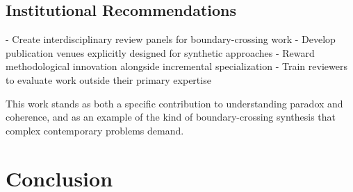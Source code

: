 \documentclass[12pt]{article}
\theoremstyle{plain}
\begin{document}
\subsection{Institutional Recommendations}

- Create interdisciplinary review panels for boundary-crossing work
- Develop publication venues explicitly designed for synthetic approaches  
- Reward methodological innovation alongside incremental specialization
- Train reviewers to evaluate work outside their primary expertise

This work stands as both a specific contribution to understanding paradox and coherence, and as an example of the kind of boundary-crossing synthesis that complex contemporary problems demand.

\section{Conclusion}



\end{document}
